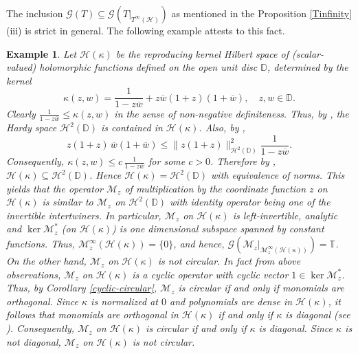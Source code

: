 \documentclass[10pt,a4paper]{amsart}
\newtheorem{remark}[theorem]{Remark}%
\newtheorem{example}[theorem]{Example}
\begin{document}

The inclusion $\mathcal G(T) \subseteq \mathcal G(T|_{T^\infty(\mathcal H)})$ as mentioned in the Proposition \ref{Tinfinity}(iii) is strict in general. The following example attests to this fact. 

\begin{example}
Let $\mathcal H(\kappa)$ be the reproducing kernel Hilbert space of (scalar-valued) holomorphic functions defined on the open unit disc $\mathbb D$, determined by the kernel
\[
\kappa(z,w)=\frac{1}{1-z\overline{w}}+z\overline{w}(1+z)(1+\overline{w}),
\quad z,w\in\mathbb D .
\]
Clearly $\frac{1}{1-z\overline{w}} \leqslant \kappa(z,w)$ in the sense of non-negative definiteness. Thus, by \cite[Theorem 5.1]{PR}, the Hardy space $\mathcal H^2(\mathbb D)$ is contained in $\mathcal H(\kappa)$. Also, by \cite[Theorem 3.11]{PR},
\[
z(1+z)\,\overline{w}(1+\overline{w}) \leqslant
\|z(1+z)\|_{\mathcal H^2(\mathbb D)}^{2}
\frac{1}{1-z\overline{w}} .
\]
Consequently, $\kappa(z,w) \leqslant c\,\frac{1}{1-z\overline{w}}$ for some $c>0$. Therefore by \cite[Theorem 5.1]{PR}, $\mathcal H(\kappa) \subseteq \mathcal H^2(\mathbb D)$. Hence $\mathcal H(\kappa) = \mathcal H^2(\mathbb D)$
with equivalence of norms. This yields that the operator $\mathscr M_z$ of multiplication by the coordinate function $z$ on $\mathcal H(\kappa)$
is similar to $\mathscr M_z$ on $\mathcal H^2(\mathbb D)$ with identity operator being one of the invertible intertwiners. In particular,
$\mathscr M_z$ on $\mathcal H(\kappa)$ is left-invertible, analytic and $\ker \mathscr M_z^*$ (on $\mathcal H(\kappa)$) is one dimensional subspace spanned by constant functions. Thus, $\mathscr M_z^\infty(\mathcal H(\kappa)) = \{0\}$, and hence, $\mathcal G(\mathscr M_z|_{\mathscr M_z^\infty(\mathcal H(\kappa))}) = \mathbb T$. On the other hand, $\mathscr M_z$ on $\mathcal H(\kappa)$ is not circular. In fact from above observations, $\mathscr M_z$ on $\mathcal H(\kappa)$ is a cyclic operator with cyclic vector $1 \in \ker \mathscr M_z^*$. Thus, by Corollary \ref{cyclic-circular}, $\mathscr M_z$ is circular if and only if monomials are orthogonal. Since $\kappa$ is normalized at $0$ and polynomials are dense in $\mathcal H(\kappa)$, it follows that monomials are orthogonal in $\mathcal H(\kappa)$ if and only if $\kappa$ is diagonal (see \cite{CS}). Consequently, $\mathscr M_z$ on $\mathcal H(\kappa)$ is circular if and only if $\kappa$ is diagonal. Since $\kappa$ is not diagonal, $\mathscr M_z$ on $\mathcal H(\kappa)$ is not circular.
\end{example}
\end{document}
